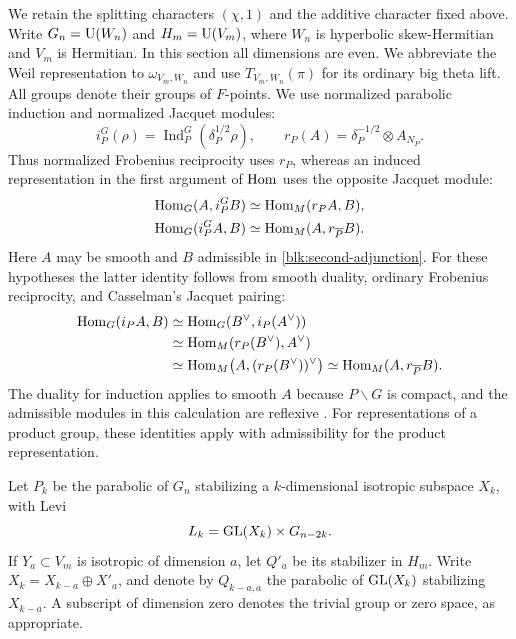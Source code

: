 We retain the splitting characters $(\chi,1)$ and the additive character
fixed above.  Write $G_n=\operatorname{U}(W_n)$ and $H_m=\operatorname{U}(V_m)$, where $W_n$ is
hyperbolic skew-Hermitian and $V_m$ is Hermitian.  In this section all
dimensions are even.  We abbreviate the Weil representation to
$\omega_{V_m,W_n}$ and use $T_{V_m,W_n}(\pi)$ for its ordinary big theta
lift.  All groups denote their groups of $F$-points.  We use normalized
parabolic induction and normalized Jacquet modules:
\[
 i_P^G(\rho)=\operatorname{Ind}_P^G
       (\delta_P^{1/2}\rho),
 \qquad
 r_P(A)=\delta_P^{-1/2}\otimes A_{N_P}.
\]
Thus normalized Frobenius reciprocity uses $r_P$, whereas an induced
representation in the first argument of $\operatorname{Hom}$ uses the opposite
Jacquet module:
\begin{align}
 \operatorname{Hom}_G(A,i_P^G B)&\simeq\operatorname{Hom}_M(r_P A,B),
       \label{blk:first-adjunction}\\
 \operatorname{Hom}_G(i_P^G A,B)&\simeq\operatorname{Hom}_M(A,r_{\overline P}B).
       \label{blk:second-adjunction}
\end{align}
Here $A$ may be smooth and $B$ admissible in
\eqref{blk:second-adjunction}.  For these hypotheses the latter identity
follows from smooth duality, ordinary Frobenius reciprocity, and
Casselman's Jacquet pairing:
\[
\begin{aligned}
 \operatorname{Hom}_G(i_P A,B)
 &\simeq\operatorname{Hom}_G(B^\vee,i_P(A^\vee))\\
 &\simeq\operatorname{Hom}_M(r_P(B^\vee),A^\vee)\\
 &\simeq\operatorname{Hom}_M\bigl(A,(r_P(B^\vee))^\vee\bigr)
  \simeq\operatorname{Hom}_M(A,r_{\overline P}B).
\end{aligned}
\]
The duality for induction applies to smooth $A$ because $P\backslash G$
is compact, and the admissible modules in this calculation are reflexive
\cite[Proposition~3.1.2, Theorems~3.2.4 and~3.3.1,
Corollary~4.2.5]{Casselman}.
For representations of a product group, these identities apply with
admissibility for the product representation.

Let $P_k$ be the parabolic of $G_n$ stabilizing a $k$-dimensional
isotropic subspace $X_k$, with Levi
\[
 L_k=\operatorname{GL}(X_k)\times G_{n-2k}.
\]
If $Y_a\subset V_m$ is isotropic of dimension $a$, let $Q'_a$ be its
stabilizer in $H_m$.  Write
$X_k=X_{k-a}\oplus X'_a$, and denote by $Q_{k-a,a}$ the parabolic of
$\operatorname{GL}(X_k)$ stabilizing $X_{k-a}$.  A subscript of dimension zero denotes
the trivial group or zero space, as appropriate.

